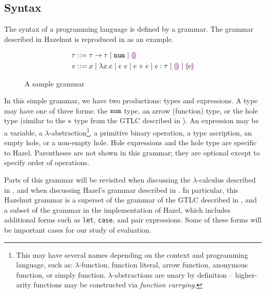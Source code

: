 \subsection{Syntax}
\label{sec:syntax}

The syntax of a programming language is defined by a grammar. The grammar described in Hazelnut \cite{conf/popl/Hazelnut17} is reproduced in  as an example.

\begin{figure}
  \centering
  \begin{mdframed}
    \begin{singlespace}
      \begin{align*}
        \tau &::= \tau\to\tau
               \mid\mathtt{num}
               \mid\textcolor{violet}{\llparenthesis}\textcolor{violet}{\rrparenthesis} \\
        e &::= x
            \mid\lambda x.e
            \mid e\ e
            \mid e+e
            \mid e:\tau
            \mid\textcolor{violet}{\llparenthesis}\textcolor{violet}{\rrparenthesis}
            \mid\textcolor{violet}{\llparenthesis} e\textcolor{violet}{\rrparenthesis}
      \end{align*}
    \end{singlespace}
  \end{mdframed}
  \caption{A sample grammar}
  \label{fig:sample-grammar}
\end{figure}

In this simple grammar, we have two productions: types and expressions. A type may have one of three forms: the $\mathtt{num}$ type, an arrow (function) type, or the hole type (similar to the $*$ type from the GTLC described in ). An expression may be a variable, a $\lambda$-abstraction\footnote{This may have several names depending on the context and programming language, such as: $\lambda$-function, function literal, arrow function, anonymous function, or simply function. $\lambda$-abstractions are unary by definition -- higher-arity functions may be constructed via \textit{function currying}.}, a primitive binary operation, a type ascription, an empty hole, or a non-empty hole. Hole expressions and the hole type are specific to Hazel. Parentheses are not shown in this grammar; they are optional except to specify order of operations.

Parts of this grammar will be revisited when discussing the $\lambda$-calculus described in , and when discussing Hazel's grammar described in . In particular, this Hazelnut grammar is a superset of the grammar of the GTLC described in , and a subset of the grammar in the implementation of Hazel, which includes additional forms such as \texttt{let}, \texttt{case}, and pair expressions. Some of these forms will be important cases for our study of evaluation.


